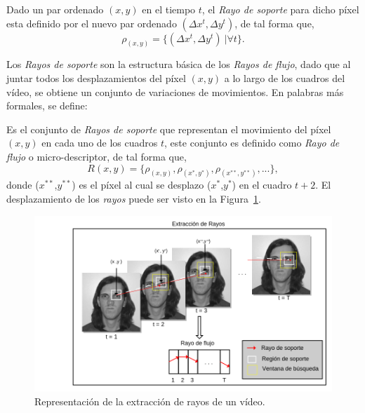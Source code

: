 	\begin{definition}
		Dado un par ordenado $(x,y)$ en el tiempo $t$, el \textit{Rayo de soporte} para dicho píxel esta definido por el nuevo par ordenado $(\Delta x^{t}, \Delta y^{t})$, de tal forma que,
		\begin{equation}
			\rho_{(x,y)} = \{(\Delta x^{t}, \Delta y^{t})~| \forall t\}.
		\end{equation}		
	\end{definition}	
		
	Los \textit{Rayos de soporte} son la estructura básica de los \textit{Rayos de flujo}, dado que al juntar todos los desplazamientos del píxel $(x,y)$ a lo largo de los cuadros del vídeo, se obtiene un conjunto de variaciones de movimientos. En palabras más formales, se define:
	
	\begin{definition}	
		Es el conjunto de \textit{Rayos de soporte} que representan el movimiento del píxel $(x,y)$ en cada uno de los cuadros $t$, este conjunto es definido como \textit{Rayo de flujo} o micro-descriptor, de tal forma que,
			\begin{equation}
				R(x,y)	 = \{\rho_{(x,y)}, \rho_{(x^*,y^*)}, \rho_{(x^{**},y^{**})}, ... \},
			\end{equation}
		donde ($x^{**}$,$y^{**}$) es el píxel al cual se desplazo ($x^{*}$,$y^{*}$) en el cuadro $t+2$. El desplazamiento de los \textit{rayos} puede ser visto en la Figura~\ref{algoritmo:fig:extraccion}.
	\end{definition}
	
	\begin{figure}[bt]
		\centering
    		\includegraphics[width=1\textwidth]{Figuras/Diagramas/Extraccion_de_rayos.png}
  		\caption{Representación de la extracción de rayos de un vídeo.}
  		\label{algoritmo:fig:extraccion}
	\end{figure}	

